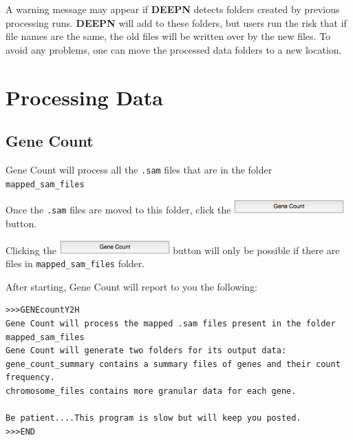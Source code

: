 \documentclass[11pt,fleqn]{book} %
\newcommand{\GeneCount}{{\color{Red} Gene Count }}
\newcommand{\DEEPN}{\textbf{DEEPN }}
\begin{document}
\begin{warning}
A warning message may appear if \DEEPN detects folders created by previous processing runs. \DEEPN will add to these folders, but users run the risk that if file names are the same, the old files will be written over by the new files. To avoid any problems, one can move the processed data folders to a new location.
\end{warning}


\part{Processing Data}



\chapter{\GeneCount}

\GeneCount will process all the \texttt{.sam} files that are in the folder \texttt{mapped\_sam\_files}

\vspace{15pt}

Once the \texttt{.sam} files are moved to this folder, click the \includegraphics[width=120pt]{Pictures/gene_count_btn} button.

\begin{remark}
Clicking the \includegraphics[width=120pt]{Pictures/gene_count_btn} button will only be possible if there are files in \texttt{mapped\_sam\_files} folder.
\end{remark}

After starting, \GeneCount will report to you the following:

\begin{lstlisting}
>>>GENEcountY2H
Gene Count will process the mapped .sam files present in the folder mapped_sam_files
Gene Count will generate two folders for its output data:
gene_count_summary contains a summary files of genes and their count frequency. 
chromosome_files contains more granular data for each gene.

Be patient....This program is slow but will keep you posted.
>>>END
\end{lstlisting}
\end{document}
